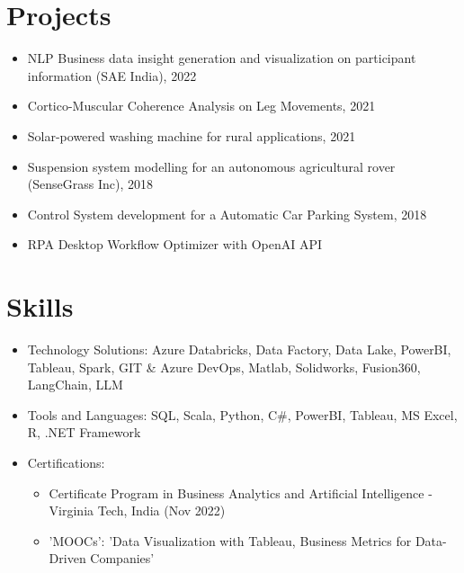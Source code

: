 \documentclass[10pt, letterpaper]{article}
\begin{document}
\section{Projects}
\begin{onecolentry}
\begin{itemize}

    \item NLP Business data insight generation and visualization on participant information (SAE India), 2022

    \item Cortico-Muscular Coherence Analysis on Leg Movements, 2021

    \item Solar-powered washing machine for rural applications, 2021

    \item Suspension system modelling for an autonomous agricultural rover (SenseGrass Inc), 2018

    \item Control System development for a Automatic Car Parking System, 2018

    \item RPA Desktop Workflow Optimizer with OpenAI API

\end{itemize}
\end{onecolentry}

\section{Skills}
\begin{onecolentry}
\begin{itemize}
    \item Technology Solutions: Azure Databricks, Data Factory, Data Lake, PowerBI, Tableau, Spark, GIT & Azure DevOps, Matlab, Solidworks, Fusion360, LangChain, LLM
    \item Tools and Languages: SQL, Scala, Python, C#, PowerBI, Tableau, MS Excel, R, .NET Framework
    \item Certifications:
    \begin{itemize}
    
        \item Certificate Program in Business Analytics and Artificial Intelligence - Virginia Tech, India (Nov 2022)
    
        \item {'MOOCs': 'Data Visualization with Tableau, Business Metrics for Data-Driven Companies'}
    
    \end{itemize}
\end{itemize}
\end{onecolentry}
\end{document}
